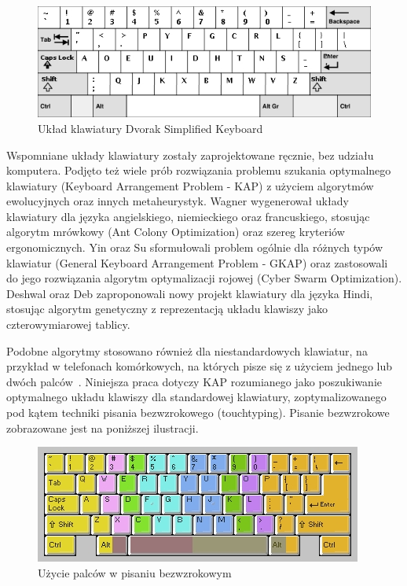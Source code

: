 \documentclass[brudnopis]{xmgr}
\begin{document}
\begin{figure}[!tbh]
\centering
\includegraphics[width=.8\hsize]{fig/dvorak}
\caption{Układ klawiatury Dvorak Simplified Keyboard}
\end{figure}

Wspomniane układy klawiatury zostały zaprojektowane ręcznie, bez udziału komputera. Podjęto też wiele prób rozwiązania problemu szukania optymalnego klawiatury (Keyboard Arrangement Problem - KAP) z użyciem algorytmów ewolucyjnych oraz innych metaheurystyk. Wagner \cite{Eggers2003672} wygenerował układy klawiatury dla języka angielskiego, niemieckiego oraz francuskiego, stosując algorytm mrówkowy (Ant Colony Optimization) oraz szereg kryteriów ergonomicznych. Yin oraz Su \cite{Yin201143} sformułowali problem ogólnie dla różnych typów klawiatur (General Keyboard Arrangement Problem - GKAP) oraz zastosowali do jego rozwiązania algorytm optymalizacji rojowej (Cyber Swarm Optimization). Deshwal oraz Deb \cite{Hindi} zaproponowali nowy projekt klawiatury dla języka Hindi, stosując algorytm genetyczny z reprezentacją układu klawiszy jako czterowymiarowej tablicy.

Podobne algorytmy stosowano również dla niestandardowych klawiatur, na przykład w telefonach komórkowych, na których pisze się z użyciem jednego lub dwóch palców~\cite{Li2006695}. Niniejsza praca dotyczy KAP rozumianego jako poszukiwanie optymalnego układu klawiszy dla standardowej klawiatury, zoptymalizowanego pod kątem techniki pisania bezwzrokowego (touchtyping). Pisanie bezwzrokowe zobrazowane jest na poniższej ilustracji.

\begin{figure}[!tbh]
\centering
\includegraphics[width=.8\hsize]{fig/touchtyping}
\caption{Użycie palców w pisaniu bezwzrokowym}
\end{figure}
\end{document}
